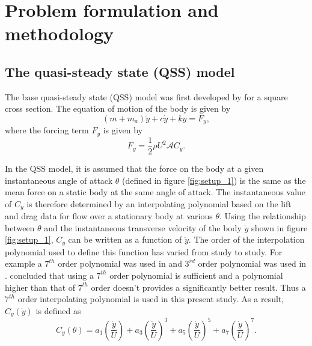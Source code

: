 
\section{Problem formulation and methodology}
\label{sec:theory}

\subsection{The quasi-steady state (QSS) model}

The base quasi-steady state (QSS) model was first developed by \citet{Parkinson1964} for a square cross section. The equation of motion of the body  is given by 
\begin{equation}
\label{equationofmotion}
(m+m_a)\ddot{y}+c\dot{y}+ky=F_y,
\end{equation}
where the forcing term $F_y$ is given by
\begin{equation}
\label{lift equation}
F_y=\frac{1}{2}\rho U^2\mathcal{A}C_y.
\end{equation}
 


In the QSS model, it is assumed that the force on the body at a given instantaneous angle of attack $\theta$ (defined in figure \ref{fig:setup_1}) is the same as the mean force on a static body at the same angle of attack. The instantaneous value of $C_y$ is therefore determined by an interpolating polynomial based on the lift and drag data  for flow over a stationary body at various $\theta$. Using the relationship between $\theta$ and the instantaneous transverse velocity of the body $\dot{y}$ shown in figure \ref{fig:setup_1}, $C_y$ can be written as a function of $\dot{y}$. The order of the interpolation polynomial used to define this function has varied from study to study. For  example a $7^{th}$ order polynomial was used in \cite{Parkinson1964} and $3^{rd}$ order polynomial was used in \cite{Barrero-Gil2009}. \cite{Ng2005} concluded that using a $7^{th}$ order polynomial is sufficient and a polynomial higher than that of $7^{th}$ order doesn't provides a significantly better result. Thus a $7 ^{th}$ order interpolating polynomial is used in this present study. As a result, $C_y(\dot{y})$ is defined as
\begin{equation}
\label{cy ploynomial}
C_y(\theta)=a_1\left(\frac{\dot{y}}{U}\right)+a_3\left(\frac{\dot{y}}{U}\right)^3+a_5\left(\frac{\dot{y}}{U}\right)^5+a_7\left(\frac{\dot{y}}{U}\right)^7.
\end{equation}

